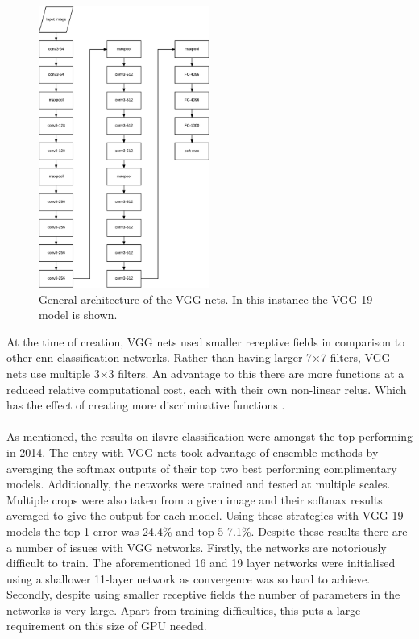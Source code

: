 \begin{figure}[H]
  \centering
    \includegraphics[width=0.5\textwidth]{Figs/Techanal/vggarch.pdf}
    \caption{General architecture of the VGG nets. In this instance the VGG-19 model is shown.}
    \label{fig:vggarch}
\end{figure}

At the time of creation, VGG nets used smaller receptive fields in comparison to other \gls{cnn} classification networks. Rather than having larger 7$\times$7 filters, VGG nets use multiple 3$\times$3 filters. An advantage to this there are more functions at a reduced relative computational cost, each with their own non-linear \glspl{relu}. Which has the effect of creating more discriminative functions \cite{vgg16}.
\\\\
As mentioned, the results on \gls{ilsvrc} classification were amongst the top performing in 2014. The entry with VGG nets took advantage of ensemble methods by averaging the softmax outputs of their top two best performing complimentary models. Additionally, the networks were trained and tested at multiple scales. Multiple crops were also taken from a given image and their softmax results averaged to give the output for each model. Using these strategies with VGG-19 models the top-1 error was 24.4\% and top-5 7.1\%. Despite these results there are a number of issues with VGG networks. Firstly, the networks are notoriously difficult to train. The aforementioned 16 and 19 layer networks were initialised using a shallower 11-layer network as convergence was so hard to achieve. Secondly, despite using smaller receptive fields the number of parameters in the networks is very large. Apart from training difficulties, this puts a large requirement on this size of GPU needed. 

